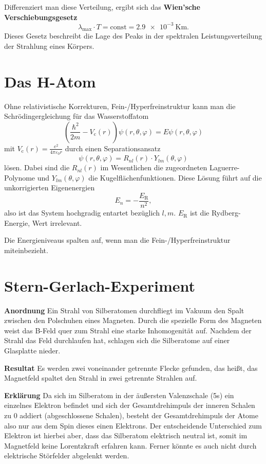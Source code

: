 Differenziert man diese Verteilung, ergibt sich das \textbf{Wien'sche Verschiebungsgesetz}
\begin{equation*}
	\lambda_\text{max}\cdot T = \text{const} = \SI{2.9e-3}{\kelvin\meter}.
\end{equation*}
Dieses Gesetz beschreibt die Lage des Peaks in der spektralen Leistungsverteilung der Strahlung eines Körpers.

\section{Das H-Atom}
Ohne relativistische Korrekturen, Fein-/Hyperfreinstruktur kann man die Schrödingergleichung für das Wasserstoffatom
\begin{equation*}
	\left(\frac{\hbar^2}{2m}-V_\text{c}(r)\right)\psi(r,\theta,\varphi) = E\psi(r,\theta,\varphi)
\end{equation*}
mit $V_\text{c}(r)=\frac{e^2}{4\pi\varepsilon_0r}$ durch einen Separationsansatz
\begin{equation*}
	\psi(r,\theta,\varphi) = R_{nl}(r)\cdot Y_{lm}(\theta,\varphi)
\end{equation*}
lösen.
Dabei sind die $R_{nl}(r)$ im Wesentlichen die zugeordneten Laguerre-Polynome und $Y_{lm}(\theta,\varphi)$ die Kugelflächenfunktionen.
Diese Lösung führt auf die unkorrigierten Eigenenergien
\begin{equation*}
	E_n = -\frac{E_\text{R}}{n^2},
\end{equation*}
also ist das System hochgradig entartet bezüglich $l,m$.
$E_\text{R}$ ist die Rydberg-Energie, Wert irrelevant.

Die Energieniveaus spalten auf, wenn man die Fein-/Hyperfreinstruktur miteinbezieht.

\section{Stern-Gerlach-Experiment}
\textbf{Anordnung}  Ein Strahl von Silberatomen durchfliegt im Vakuum den Spalt zwischen den Polschuhen eines Magneten.
Durch die spezielle Form des Magneten weist das B-Feld quer zum Strahl eine starke Inhomogenität auf.
Nachdem der Strahl das Feld durchlaufen hat, schlagen sich die Silberatome auf einer Glasplatte nieder.

\textbf{Resultat}  Es werden zwei voneinander getrennte Flecke gefunden, das heißt, das Magnetfeld spaltet den Strahl in zwei getrennte Strahlen auf.

\textbf{Erklärung}  Da sich im Silberatom in der äußersten Valenzschale (5s) ein einzelnes Elektron befindet und sich der Gesamtdrehimpuls der inneren Schalen zu 0 addiert (abgeschlossene Schalen), besteht der Gesamtdrehimpuls der Atome also nur aus dem Spin dieses einen Elektrons.
Der entscheidende Unterschied zum Elektron ist hierbei aber, dass das Silberatom elektrisch neutral ist, somit im Magnetfeld keine Lorentzkraft erfahren kann.
Ferner könnte es auch nicht durch elektrische Störfelder abgelenkt werden.

